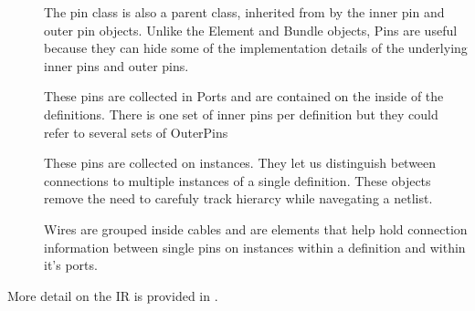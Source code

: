 \documentclass[letterpaper,10pt,english,openany,oneside]{sphinxmanual}
\begin{document}
\begin{description}
\item[{}] \leavevmode
The pin class is also a parent class, inherited from by the inner pin and outer pin objects. Unlike the Element and Bundle objects, Pins are useful because they can hide some of the implementation details of the underlying inner pins and outer pins.

\item[{}] \leavevmode
These pins are collected in Ports and are contained on the inside of the definitions. There is one set of inner pins per definition but they could refer to several sets of OuterPins

\item[{}] \leavevmode
These pins are collected on instances. They let us distinguish between connections to multiple instances of a single definition. These objects remove the need to carefuly track hierarcy while navegating a netlist.

\item[{}] \leavevmode
Wires are grouped inside cables and are elements that help hold connection information between single pins on instances within a definition and within it’s ports.

\end{description}

More detail on the IR is provided in {\hyperref[\detokenize{reference/classes/index:api-summary}]{}}.



\renewcommand{\indexname}{Index}
\printindex
\end{document}
